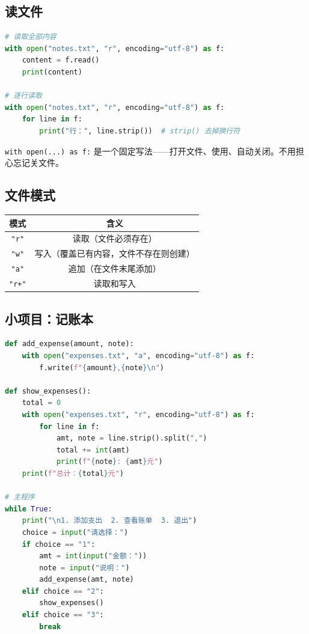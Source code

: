 \documentclass[a4paper,12pt]{ctexart}
\begin{document}
\subsection*{读文件}

\begin{lstlisting}[language=Python]
# 读取全部内容
with open("notes.txt", "r", encoding="utf-8") as f:
    content = f.read()
    print(content)

# 逐行读取
with open("notes.txt", "r", encoding="utf-8") as f:
    for line in f:
        print("行：", line.strip())  # strip() 去掉换行符
\end{lstlisting}

\texttt{with open(...) as f:} 是一个固定写法——打开文件、使用、自动关闭。不用担心忘记关文件。

\subsection*{文件模式}

\begin{center}
\begin{tabular}{|c|c|}
\hline
\textbf{模式} & \textbf{含义} \\ \hline
\texttt{"r"} & 读取（文件必须存在） \\ \hline
\texttt{"w"} & 写入（覆盖已有内容，文件不存在则创建） \\ \hline
\texttt{"a"} & 追加（在文件末尾添加） \\ \hline
\texttt{"r+"} & 读取和写入 \\ \hline
\end{tabular}
\end{center}

\subsection*{小项目：记账本}

\begin{lstlisting}[language=Python]
def add_expense(amount, note):
    with open("expenses.txt", "a", encoding="utf-8") as f:
        f.write(f"{amount},{note}\n")

def show_expenses():
    total = 0
    with open("expenses.txt", "r", encoding="utf-8") as f:
        for line in f:
            amt, note = line.strip().split(",")
            total += int(amt)
            print(f"{note}: {amt}元")
    print(f"总计：{total}元")

# 主程序
while True:
    print("\n1. 添加支出  2. 查看账单  3. 退出")
    choice = input("请选择：")
    if choice == "1":
        amt = int(input("金额："))
        note = input("说明：")
        add_expense(amt, note)
    elif choice == "2":
        show_expenses()
    elif choice == "3":
        break
\end{lstlisting}
\end{document}
